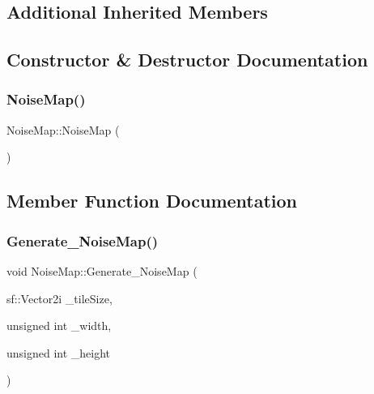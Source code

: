 \subsection*{Additional Inherited Members}


\subsection{Constructor \& Destructor Documentation}
\mbox{\label{class_noise_map_a546a2d955da99a4f230a241ab5079a37}} 
\subsubsection{\texorpdfstring{Noise\+Map()}{NoiseMap()}}
{\footnotesize\ttfamily Noise\+Map\+::\+Noise\+Map (\begin{DoxyParamCaption}{ }\end{DoxyParamCaption})}



\subsection{Member Function Documentation}
\mbox{\label{class_noise_map_a551072fd54a96722c96dea40dc24940e}} 
\subsubsection{\texorpdfstring{Generate\+\_\+\+Noise\+Map()}{Generate\_NoiseMap()}}
{\footnotesize\ttfamily void Noise\+Map\+::\+Generate\+\_\+\+Noise\+Map (\begin{DoxyParamCaption}\item[{sf\+::\+Vector2i}]{\+\_\+tile\+Size,  }\item[{unsigned int}]{\+\_\+width,  }\item[{unsigned int}]{\+\_\+height }\end{DoxyParamCaption})}

